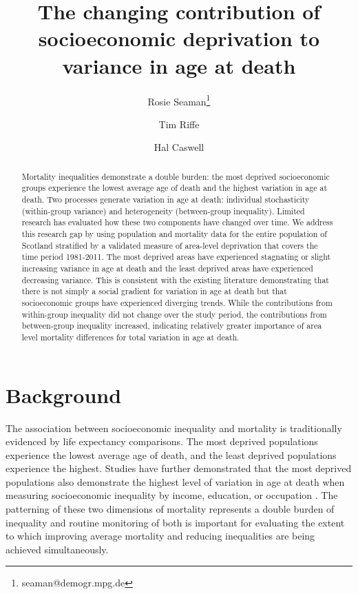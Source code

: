 \documentclass[12pt,oneside,a4paper]{article} %
\theoremstyle{definition}
\begin{document}
\title{The changing contribution of socioeconomic deprivation to variance in age at death}
\author[1]{Rosie Seaman\thanks{seaman@demogr.mpg.de}}
\author[1]{Tim Riffe}
\author[2]{Hal Caswell}


\maketitle

\begin{abstract}
Mortality inequalities demonstrate a double burden: the most deprived socioeconomic
groups experience the lowest average age of death and the highest variation in
age at death. Two processes generate variation in age at death: individual
stochasticity (within-group variance) and heterogeneity (between-group
inequality). Limited research has evaluated how these two components have
changed over time. We address this research gap by using population and
mortality data for the entire population of Scotland stratified by a validated
measure of area-level deprivation that covers the time period 1981-2011. The
most deprived areas have experienced stagnating or slight increasing variance in
age at death and the least deprived areas have experienced decreasing variance.
This is consistent with the existing literature demonstrating that there is not
simply a social gradient for variation in age at death but that socioeconomic groups have experienced diverging trends. While the contributions from within-group inequality did not change over the study period, the contributions from between-group inequality increased, indicating relatively greater importance of area level mortality differences for total variation in age at death.
\end{abstract}

\section{Background}
The association between socioeconomic inequality and mortality is traditionally
evidenced by life expectancy comparisons. The most deprived populations
experience the lowest average age of death, and the least deprived populations
experience the highest. Studies have further demonstrated that the most deprived
populations also demonstrate the highest level of variation in age at death when
measuring socioeconomic inequality by income, education, or occupation
\citep{Broennum-Hansen2017,Raalte2011,Sasson2016,Raalte2014}. The patterning of these two dimensions of mortality represents a double burden of inequality and routine monitoring of both is important for evaluating the extent to which improving average mortality and reducing inequalities are being achieved simultaneously.
\end{document}
